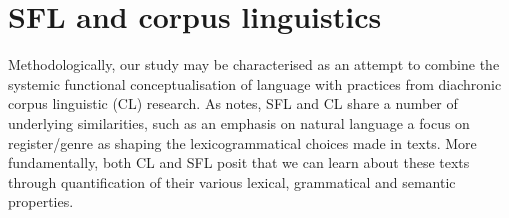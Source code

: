 

	\section{SFL and corpus linguistics}

		Methodologically, our study may be characterised as an attempt to combine the systemic functional conceptualisation of language with practices from diachronic corpus linguistic (CL) research. As  notes, SFL and CL share a number of underlying similarities, such as an emphasis on natural language a focus on register/genre as shaping the lexicogrammatical choices made in texts. More fundamentally, both CL and SFL posit that we can learn about these texts through quantification of their various lexical, grammatical and semantic properties. %

